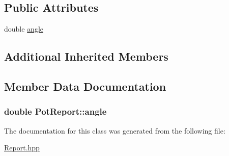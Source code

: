 \subsection*{Public Attributes}
\begin{DoxyCompactItemize}
\item 
double \hyperlink{classPotReport_a8f105b922784744df3133665ac4ffd85}{angle}
\end{DoxyCompactItemize}
\subsection*{Additional Inherited Members}


\subsection{Member Data Documentation}
\subsubsection[{\texorpdfstring{angle}{angle}}]{\setlength{\rightskip}{0pt plus 5cm}double Pot\+Report\+::angle}\hypertarget{classPotReport_a8f105b922784744df3133665ac4ffd85}{}\label{classPotReport_a8f105b922784744df3133665ac4ffd85}


The documentation for this class was generated from the following file\+:\begin{DoxyCompactItemize}
\item 
\hyperlink{Report_8hpp}{Report.\+hpp}\end{DoxyCompactItemize}
